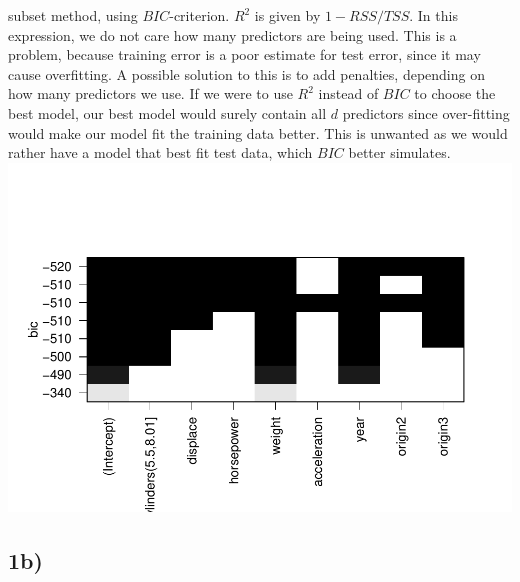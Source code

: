 \documentclass[]{article}
\begin{document}
\begin{itemize}
  subset method, using \(BIC\)-criterion. \(R^2\) is given by
  \(1-RSS/TSS\). In this expression, we do not care how many predictors
  are being used. This is a problem, because training error is a poor
  estimate for test error, since it may cause overfitting. A possible
  solution to this is to add penalties, depending on how many predictors
  we use. If we were to use \(R^2\) instead of \(BIC\) to choose the
  best model, our best model would surely contain all \(d\) predictors
  since over-fitting would make our model fit the training data better.
  This is unwanted as we would rather have a model that best fit test
  data, which \(BIC\) better simulates.
  \includegraphics{1_files/figure-latex/unnamed-chunk-1-1.pdf}
\end{itemize}

\subsection{1b)}\label{b}
\end{document}
